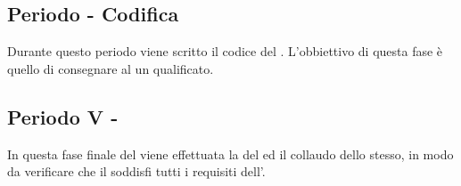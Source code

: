 \documentclass[./PianoDiProgetto.tex]{subfiles}
\begin{document}
  \subsection{Periodo  - Codifica}

  Durante questo periodo viene scritto il codice del . L'obbiettivo
  di questa fase è quello di consegnare al  un  qualificato.

  \subsection{Periodo V - }

  In questa fase finale del  viene effettuata la  del  ed il
  collaudo dello stesso, in modo da verificare che il  soddisfi tutti i requisiti
  dell'\ARdoc. 
\end{document}
